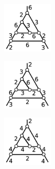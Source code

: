\documentclass[suppldata, dvipdfmx]{interact}
\theoremstyle{plain}%
\theoremstyle{definition}
\theoremstyle{remark}
\theoremstyle{problemstyle}
\begin{document}
\begin{figure}[h!tbp]
 \hspace*{\fill}
  \begin{minipage}[t]{0.23\textwidth}
   \centering
   \includegraphics[width=1in, keepaspectratio]{./img/HexahedraWithSphericalFaces/hexahedralCake1/f.jpg}
   \subcaption{}
   \label{fig:cake1f}
  \end{minipage}
 \hspace*{\fill}
  \begin{minipage}[t]{0.23\textwidth}
   \centering
   \includegraphics[width=1in, keepaspectratio]{./img/HexahedraWithSphericalFaces/hexahedralCake1/h.jpg}
   \subcaption{}
   \label{fig:cake1h}
  \end{minipage}
 \hspace*{\fill}
  \begin{minipage}[t]{0.23\textwidth}
   \centering
   \includegraphics[width=1in, keepaspectratio]{./img/HexahedraWithSphericalFaces/hexahedralCake1/j.jpg}

\end{minipage}
\end{figure}
\end{document}
